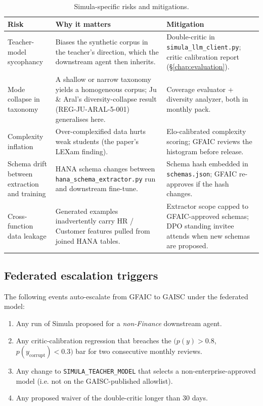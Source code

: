 \documentclass[11pt,a4paper]{article}
\begin{document}
\begin{table}[H]
\centering
\caption{Simula-specific risks and mitigations.}
\label{tab:simula-risks}
\begin{tabularx}{\textwidth}{p{3.8cm}Xp{3.8cm}}
\toprule
\textbf{Risk} & \textbf{Why it matters} & \textbf{Mitigation} \\
\midrule
Teacher-model sycophancy &
  Biases the synthetic corpus in the teacher's direction, which the
  downstream agent then inherits. &
  Double-critic in \texttt{simula\_llm\_client.py}; critic
  calibration report (\S\ref{chap:evaluation}). \\
Mode collapse in taxonomy &
  A shallow or narrow taxonomy yields a homogeneous corpus; Ju \&
  Aral's diversity-collapse result (REG-JU-ARAL-5-001) generalises
  here. &
  Coverage evaluator + diversity analyzer, both in monthly pack. \\
Complexity inflation &
  Over-complexified data hurts weak students (the paper's LEXam
  finding). &
  Elo-calibrated complexity scoring; GFAIC reviews the histogram
  before release. \\
Schema drift between extraction and training &
  HANA schema changes between
  \texttt{hana\_schema\_extractor.py} run and downstream fine-tune. &
  Schema hash embedded in \texttt{schemas.json}; GFAIC re-approves
  if the hash changes. \\
Cross-function data leakage &
  Generated examples inadvertently carry HR / Customer features
  pulled from joined HANA tables. &
  Extractor scope capped to GFAIC-approved schemas; DPO standing
  invitee attends when new schemas are proposed. \\
\bottomrule
\end{tabularx}
\end{table}

\subsection{Federated escalation triggers}

The following events auto-escalate from GFAIC to GAISC under the
federated model:

\begin{enumerate}[nosep]
  \item Any run of Simula proposed for a \emph{non-Finance}
        downstream agent.
  \item Any critic-calibration regression that breaches the
        $(p(y) > 0.8$, $p(y_{\text{corrupt}}) < 0.3)$ bar for two
        consecutive monthly reviews.
  \item Any change to \texttt{SIMULA\_TEACHER\_MODEL} that selects a
        non-enterprise-approved model (i.e. not on the GAISC-published
        allowlist).
  \item Any proposed waiver of the double-critic longer than 30 days.
\end{enumerate}
\end{document}
